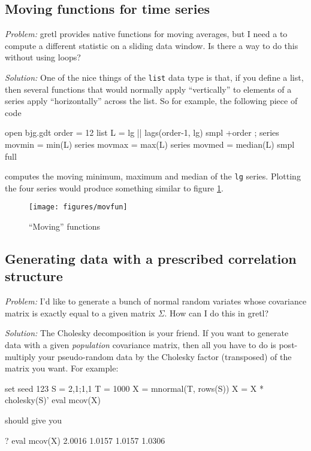 \subsection{Moving functions for time series}
\label{sec:movfun}

\emph{Problem:} gretl provides native functions for moving
averages, but I need a to compute a different statistic on a sliding
data window. Is there a way to do this without using loops?

\emph{Solution:} One of the nice things of the \texttt{list} data type
is that, if you define a list, then several functions that would
normally apply ``vertically'' to elements of a series apply
``horizontally'' across the list. So for example, the following piece
of code
\begin{code}
open bjg.gdt
order = 12
list L = lg || lags(order-1, lg)
smpl +order ;
series movmin = min(L)
series movmax = max(L)
series movmed = median(L)
smpl full
\end{code}
computes the moving minimum, maximum and median of the \texttt{lg}
series. Plotting the four series would produce something similar to
figure \ref{fig:movfun}.

\begin{figure}[hbtp]
  \centering
  \texttt{[image: figures/movfun]}
  \caption{``Moving'' functions}
  \label{fig:movfun}
\end{figure}

\subsection{Generating data with a prescribed correlation structure}
\label{sec:CholeskyTrick}

\emph{Problem:} I'd like to generate a bunch of normal random variates
whose covariance matrix is exactly equal to a given matrix
$\Sigma$. How can I do this in gretl?

\emph{Solution:} The Cholesky decomposition is your friend. If you
want to generate data with a given \emph{population} covariance
matrix, then all you have to do is post-multiply your pseudo-random
data by the Cholesky factor (transposed) of the matrix you want. For
example:
\begin{code}
set seed 123
S = {2,1;1,1}
T = 1000
X = mnormal(T, rows(S))
X = X * cholesky(S)'
eval mcov(X)
\end{code}
should give you
\begin{code}
? eval mcov(X)
      2.0016       1.0157
      1.0157       1.0306
\end{code}

